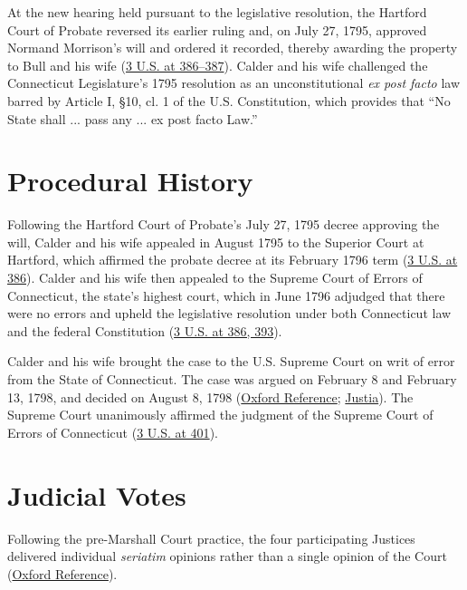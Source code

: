 \documentclass[12pt]{article}
\begin{document}
At the new hearing held pursuant to the legislative resolution, the Hartford Court of Probate reversed its earlier ruling and, on July 27, 1795, approved Normand Morrison's will and ordered it recorded, thereby awarding the property to Bull and his wife (\href{https://supreme.justia.com/cases/federal/us/3/386/}{3 U.S. at 386--387}). Calder and his wife challenged the Connecticut Legislature's 1795 resolution as an unconstitutional \textit{ex post facto} law barred by Article I, \S 10, cl. 1 of the U.S. Constitution, which provides that ``No State shall ... pass any ... ex post facto Law.''

\section{Procedural History}

Following the Hartford Court of Probate's July 27, 1795 decree approving the will, Calder and his wife appealed in August 1795 to the Superior Court at Hartford, which affirmed the probate decree at its February 1796 term (\href{https://supreme.justia.com/cases/federal/us/3/386/}{3 U.S. at 386}). Calder and his wife then appealed to the Supreme Court of Errors of Connecticut, the state's highest court, which in June 1796 adjudged that there were no errors and upheld the legislative resolution under both Connecticut law and the federal Constitution (\href{https://supreme.justia.com/cases/federal/us/3/386/}{3 U.S. at 386, 393}).

Calder and his wife brought the case to the U.S. Supreme Court on writ of error from the State of Connecticut. The case was argued on February 8 and February 13, 1798, and decided on August 8, 1798 (\href{https://www.oxfordreference.com/display/10.1093/oi/authority.20110803095542467}{Oxford Reference}; \href{https://supreme.justia.com/cases/federal/us/3/386/}{Justia}). The Supreme Court unanimously affirmed the judgment of the Supreme Court of Errors of Connecticut (\href{https://supreme.justia.com/cases/federal/us/3/386/}{3 U.S. at 401}).

\section{Judicial Votes}

Following the pre-Marshall Court practice, the four participating Justices delivered individual \textit{seriatim} opinions rather than a single opinion of the Court (\href{https://www.oxfordreference.com/display/10.1093/oi/authority.20110803095542467}{Oxford Reference}).
\end{document}
